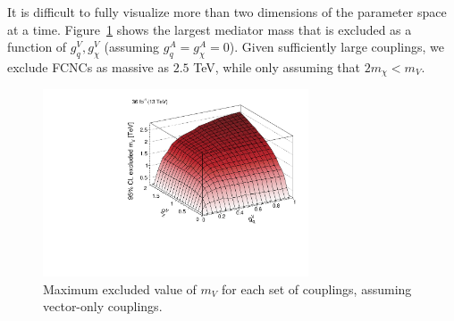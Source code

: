 It is difficult to fully visualize more than two dimensions of the parameter space at a time.
Figure~\ref{fig:mt:fcnc_obs_mgg} shows the largest mediator mass that is excluded as a function of $g_q^V,g_\chi^V$ (assuming $g_q^A = g_\chi^A = 0$).
Given sufficiently large couplings, we exclude FCNCs as massive as $2.5$ TeV, while only assuming that $2m_\chi < m_V$.


\begin{figure}[]
    \begin{center}
        \includegraphics[width=0.7\textwidth]{figures/monotop/results/fcnc3d_obs_vector.pdf}
        \caption{Maximum excluded value of $m_V$ for each set of couplings, assuming vector-only couplings.}
        \label{fig:mt:fcnc_obs_mgg}
    \end{center}
\end{figure}


